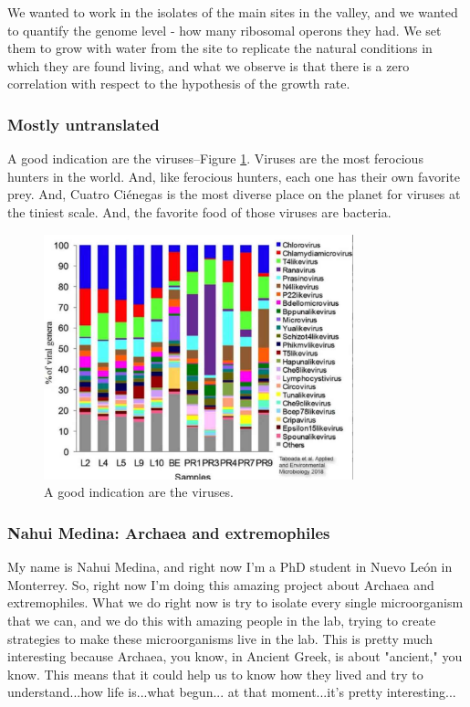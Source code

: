 \documentclass[]{article}
\begin{document}
We wanted to work in the isolates of the main sites in the valley, and we wanted to quantify the genome level - how many ribosomal operons they had. We set them to grow
with water from the site to replicate the natural conditions in which they are found living, and what we observe is that there is a zero correlation with respect to the hypothesis of the growth rate.

\subsubsection{Mostly untranslated}
A good indication are the viruses--Figure \ref{fig:QuatroCinegasViruses}. Viruses are the most ferocious hunters in the world. And, like ferocious hunters, each one has their own favorite prey. And, Cuatro  Ci\'enegas is the most diverse place on the planet for viruses at the tiniest scale. And, the favorite food of those viruses are bacteria.

\begin{figure}[H]
	\caption{A good indication are the viruses.}\label{fig:QuatroCinegasViruses}
	\includegraphics[width=0.8\textwidth]{QuatroCinegasViruses}
\end{figure}

\subsubsection{Nahui Medina: Archaea and extremophiles}
My name is Nahui Medina, and right now I'm a PhD student in Nuevo Le\'on in Monterrey. So, right now I'm doing this amazing project about Archaea and extremophiles. What we do right now is try to isolate every single microorganism that we can, and we do this with amazing people in the lab, trying to create strategies to make these microorganisms live in the lab. This is pretty much interesting because Archaea, you know, in Ancient Greek, is about "ancient," you know. This means that it could help us to know how they lived and try to understand...how life is...what begun... at that moment...it's pretty interesting...
\end{document}
